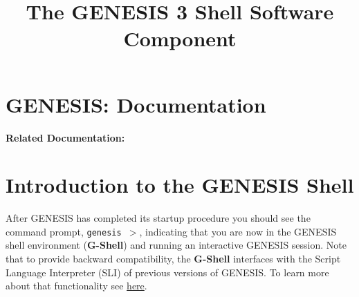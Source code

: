 \documentclass[12pt]{article}
\begin{document}

\title{\bf The GENESIS 3 Shell Software Component}

\maketitle

\section*{GENESIS: Documentation}

{\bf Related Documentation:}

\section*{Introduction to the GENESIS Shell}

After GENESIS has completed its startup procedure you should see the command prompt, {\tt genesis $>$}, indicating that you are now in the GENESIS shell environment ({\bf G-Shell}) and running an interactive GENESIS session. Note that to provide backward compatibility, the {\bf G-Shell} interfaces with the Script Language Interpreter (SLI) of previous versions of GENESIS. To learn more about that functionality see \href{../backward-compatibility/backward-compatibility.tex}{here}.




\end{document}
